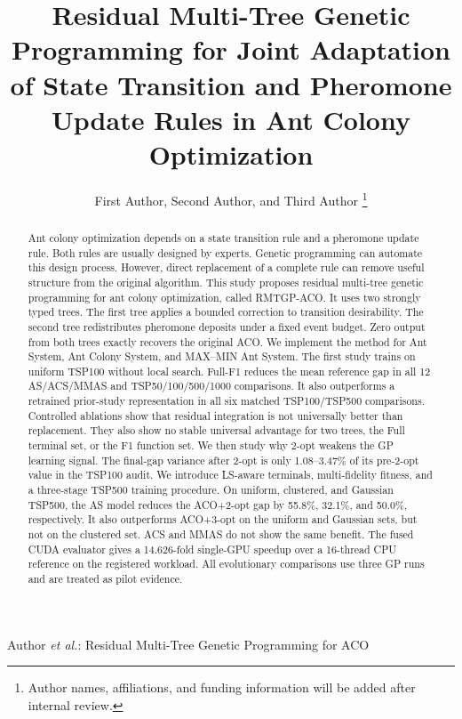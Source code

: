 \documentclass[letterpaper,journal]{IEEEtran}
\begin{document}
\title{Residual Multi-Tree Genetic Programming for Joint Adaptation of State Transition and Pheromone Update Rules in Ant Colony Optimization}

\author{First Author, Second Author, and Third Author%
\thanks{Author names, affiliations, and funding information will be added after internal review.}}

%
{Author \MakeLowercase{\textit{et al.}}: Residual Multi-Tree Genetic Programming for ACO}

\maketitle

\begin{abstract}
Ant colony optimization depends on a state transition rule and a pheromone update rule.
Both rules are usually designed by experts.
Genetic programming can automate this design process.
However, direct replacement of a complete rule can remove useful structure from the original algorithm.
This study proposes residual multi-tree genetic programming for ant colony optimization, called RMTGP-ACO.
It uses two strongly typed trees.
The first tree applies a bounded correction to transition desirability.
The second tree redistributes pheromone deposits under a fixed event budget.
Zero output from both trees exactly recovers the original ACO.
We implement the method for Ant System, Ant Colony System, and MAX--MIN Ant System.
The first study trains on uniform TSP100 without local search.
Full-F1 reduces the mean reference gap in all 12 AS/ACS/MMAS and
TSP50/100/500/1000 comparisons.
It also outperforms a retrained prior-study representation in all six
matched TSP100/TSP500 comparisons.
Controlled ablations show that residual integration is not universally
better than replacement.
They also show no stable universal advantage for two trees, the Full
terminal set, or the F1 function set.
We then study why 2-opt weakens the GP learning signal.
The final-gap variance after 2-opt is only 1.08--3.47\% of its pre-2-opt
value in the TSP100 audit.
We introduce LS-aware terminals, multi-fidelity fitness, and a three-stage
TSP500 training procedure.
On uniform, clustered, and Gaussian TSP500, the AS model reduces the
ACO+2-opt gap by 55.8\%, 32.1\%, and 50.0\%, respectively.
It also outperforms ACO+3-opt on the uniform and Gaussian sets, but not on
the clustered set.
ACS and MMAS do not show the same benefit.
The fused CUDA evaluator gives a 14.626-fold single-GPU speedup over a
16-thread CPU reference on the registered workload.
All evolutionary comparisons use three GP runs and are treated as pilot
evidence.
\end{abstract}
\end{document}
